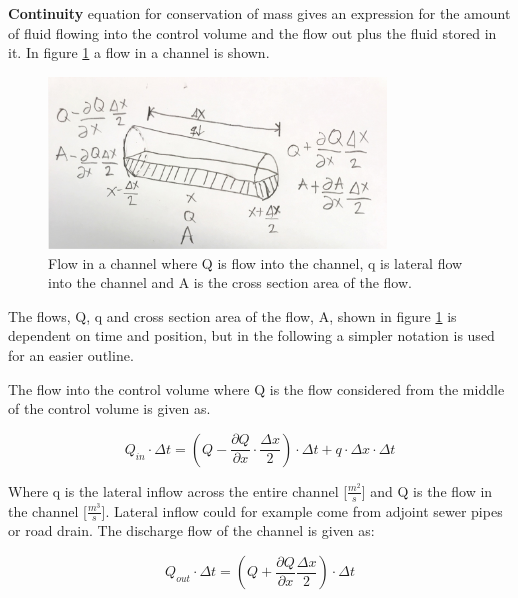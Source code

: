 \textbf{Continuity} equation for conservation of mass gives an expression for the amount of fluid flowing into the control volume and the flow out plus the fluid stored in it. 
In figure \ref{fig:firkant_kloak} a flow in a channel is shown. 

\begin{figure}[H]
\centering
\includegraphics[width=0.8\textwidth]{report/modeling/pictures/continuity_open_channel.jpg}
\caption{Flow in a channel where Q is flow into the channel, q is lateral flow into the channel and A is the cross section area of the flow.}
\label{fig:firkant_kloak}
\end{figure}

The flows, Q, q and cross section area of the flow, A, shown in figure \ref{fig:firkant_kloak} is dependent on time and position, but in the following a simpler notation is used for an easier outline. 

The flow into the control volume where Q is the flow considered from the middle of the control volume is given as.

\begin{equation}
Q_{in} \cdot \Delta t =	\left(Q - \frac{\partial Q}{\partial x}\cdot \frac{\Delta x}{2}\right) \cdot \Delta t + q \cdot \Delta x \cdot \Delta t
\label{flowin_saintbernard}
\end{equation}

Where q is the lateral inflow across the entire channel [$\frac{m^2}{s}$] and Q is the flow in the channel [$\frac{m^3}{s}$]. Lateral inflow could for example come from adjoint sewer pipes or road drain.
The discharge flow of the channel is given as:

\begin{equation}
Q_{out} \cdot \Delta t =\left(Q + \frac{\partial Q}{ \partial x} \frac{\Delta x}{2} \right) \cdot \Delta t 
\label{flowout_saintbernard}
\end{equation}

